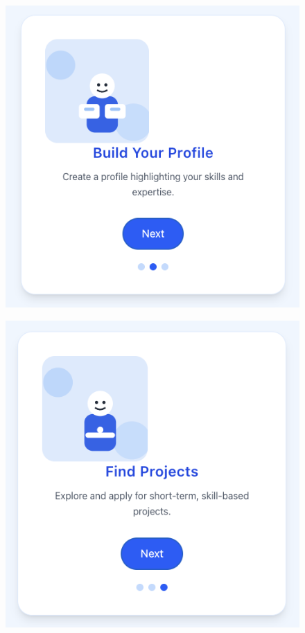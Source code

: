 \begin{figure}[h]
\begin{minipage}[b]{0.48\linewidth}
    \includegraphics[width=\linewidth]{figures/Onboarding-2.png}
  \end{minipage}\hfill
  \begin{minipage}[b]{0.48\linewidth}
    \includegraphics[width=\linewidth]{figures/Onboarding-3.png}\\[0.3em]

\end{minipage}
\end{figure}
